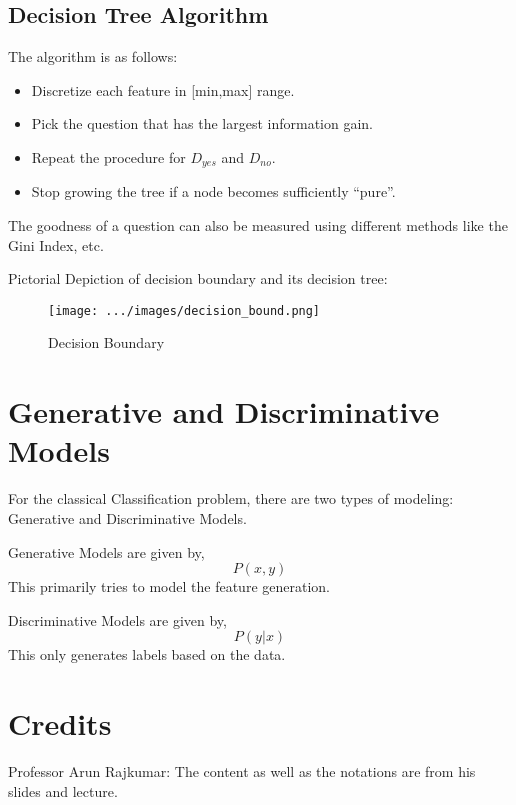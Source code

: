 \documentclass[
]{article}
\providecommand{\tightlist}{%
  \setlength{\itemsep}{0pt}\setlength{\parskip}{0pt}}
\begin{document}
\hypertarget{decision-tree-algorithm}{%
\subsection{Decision Tree Algorithm}\label{decision-tree-algorithm}}

The algorithm is as follows:

\begin{itemize}
\tightlist
\item
  Discretize each feature in {[}min,max{]} range.
\item
  Pick the question that has the largest information gain.
\item
  Repeat the procedure for \(D_{yes}\) and \(D_{no}\).
\item
  Stop growing the tree if a node becomes sufficiently ``pure''.
\end{itemize}

The goodness of a question can also be measured using different methods
like the Gini Index, etc.

Pictorial Depiction of decision boundary and its decision tree:

\begin{figure}
\centering
\texttt{[image: .../images/decision\_bound.png]}
\caption{Decision Boundary}
\end{figure}

\hypertarget{generative-and-discriminative-models}{%
\section{Generative and Discriminative
Models}\label{generative-and-discriminative-models}}

For the classical Classification problem, there are two types of
modeling: Generative and Discriminative Models.

Generative Models are given by, \[
P(x,y)
\] This primarily tries to model the feature generation.

Discriminative Models are given by, \[
P(y|x)
\] This only generates labels based on the data.

\hypertarget{credits}{%
\section{Credits}\label{credits}}

Professor Arun Rajkumar: The content as well as the notations are from
his slides and lecture.
\end{document}
